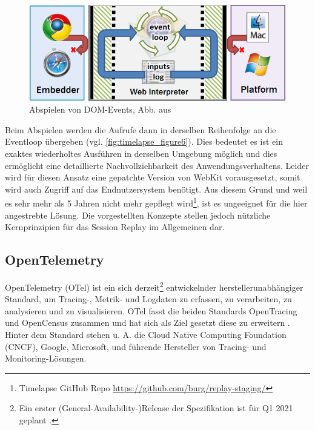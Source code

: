 \begin{figure}
\centering
\includegraphics[width=\linewidth]{img/03_methoden/timelapse_figure6.png}
\caption{Abspielen von DOM-Events, Abb. aus \cite{TimelapsePaper}}
\label{fig:timelapse_figure6}
\end{figure}

Beim Abspielen werden die Aufrufe dann in derselben Reihenfolge an die Eventloop übergeben (vgl. \autoref{fig:timelapse_figure6}). Dies bedeutet es ist ein exaktes wiederholtes Ausführen in derselben Umgebung möglich und dies ermöglicht eine detaillierte Nachvollziehbarkeit des Anwendungsverhaltens. Leider wird für diesen Ansatz eine gepatchte Version von WebKit vorausgesetzt, somit wird auch Zugriff auf das Endnutzersystem benötigt. Aus diesem Grund und weil es sehr mehr als 5 Jahren nicht mehr gepflegt wird\footnote{Timelapse GitHub Repo \url{https://github.com/burg/replay-staging/}}, ist es ungeeignet für die hier angestrebte Lösung. Die vorgestellten Konzepte stellen jedoch nützliche Kernprinzipien für das Session Replay im Allgemeinen dar.

\subsection{OpenTelemetry}
\label{subsec:opentelemetry}

OpenTelemetry (OTel) \cite{OpenTelemetry} ist ein sich derzeit\footnote{Ein erster (General-Availability-)Release der Spezifikation ist für Q1 2021 geplant \cite{OpenTelemetryGARelease}.} entwickelnder herstellerunabhängiger Standard, um Tracing-, Metrik- und Logdaten\footnotemark{} zu erfassen, zu verarbeiten, zu analysieren und zu visualisieren. OTel fasst die beiden Standards OpenTracing und OpenCensus \cite{OpenCensus} zusammen und hat sich als Ziel gesetzt diese zu erweitern \cite{UseNixDistributiveTracing}. Hinter dem Standard stehen u. A. die Cloud Native Computing Foundation (CNCF), Google, Microsoft, und führende Hersteller von Tracing- und Monitoring-Lösungen.

